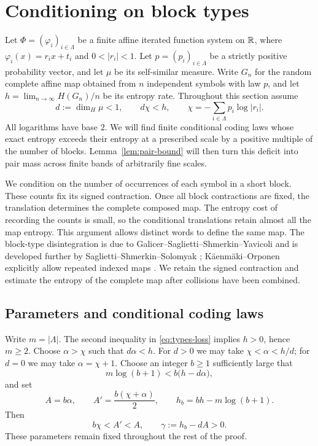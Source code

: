 \section{Conditioning on block types}\label{sec:types}

Let $\Phi=(\varphi_i)_{i\in\Lambda}$ be a finite affine iterated function
system on $\mathbb R$, where
$\varphi_i(x)=r_ix+t_i$ and $0<|r_i|<1$.
Let $p=(p_i)_{i\in\Lambda}$ be a strictly positive probability vector,
and let $\mu$ be its self-similar measure.  Write $G_n$ for the random
complete affine map obtained from $n$ independent symbols with law $p$,
and let $h=\lim_{n\to\infty}H(G_n)/n$ be its entropy rate.
Throughout this section assume
\begin{equation}\label{eq:types-loss}
 d:=\dim_H\mu<1,
 \qquad d\chi<h,
 \qquad \chi=-\sum_{i\in\Lambda}p_i\log|r_i|.
\end{equation}
All logarithms have base $2$.
We will find finite conditional coding laws whose exact entropy exceeds
their entropy at a prescribed scale by a positive multiple of the number
of blocks.  Lemma~\ref{lem:pair-bound} will then turn this deficit into
pair mass across finite bands of arbitrarily fine scales.

We condition on the number of occurrences of each symbol in a short
block.  These counts fix its signed contraction.  Once all block
contractions are fixed, the translation determines the complete
composed map.  The entropy cost of recording the counts is small, so
the conditional translations retain almost all the map entropy.
This argument allows distinct words to define the same map.
The block-type disintegration is due to
Galicer--Saglietti--Shmerkin--Yavicoli
\cite[Section~6.4, Lemma~6.6]{GalicerSagliettiShmerkinYavicoli2016}
and is developed further by Saglietti--Shmerkin--Solomyak
\cite[Lemma~6.2]{SagliettiShmerkinSolomyak2018};
K\"aenm\"aki--Orponen explicitly allow repeated indexed maps
\cite[Section~2.2, Proposition~2.8]{KaenmakiOrponen2023}.
We retain the signed contraction and estimate the entropy of the complete
map after collisions have been combined.

\subsection{Parameters and conditional coding laws}

Write $m=|\Lambda|$.  The second inequality in
\eqref{eq:types-loss} implies $h>0$, hence $m\ge2$.
Choose $\alpha>\chi$ such that $d\alpha<h$.
For $d>0$ we may take $\chi<\alpha<h/d$; for $d=0$ we may take
$\alpha=\chi+1$.
Choose an integer $b\ge1$ sufficiently large that
\[
 m\log(b+1)<b\bigl(h-d\alpha\bigr),
\]
and set
\begin{equation}\label{eq:types-parameters}
 A=b\alpha,
 \qquad A'=\frac{b(\chi+\alpha)}2,
 \qquad h_b=bh-m\log(b+1).
\end{equation}
Then
\begin{equation}\label{eq:types-gap}
 b\chi<A'<A,
 \qquad \gamma:=h_b-dA>0.
\end{equation}
These parameters remain fixed throughout the rest of the proof.

